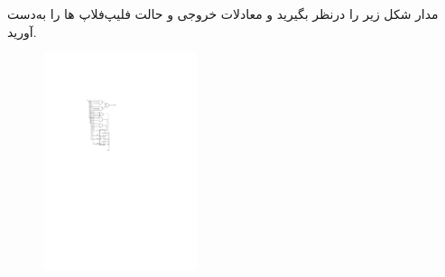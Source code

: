 

مدار شکل زیر را درنظر بگیرید و معادلات خروجی و حالت فلیپ‌فلاپ ها را به‌دست آورید. \newpage

\begin{figure}[h]
	\centering
	\includegraphics[width=0.4\textwidth]{fig/Q_basic2.pdf}
	\label{fig:Q_basic_2}
\end{figure}